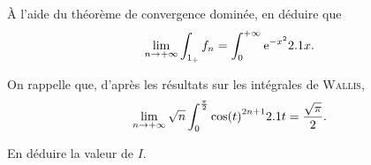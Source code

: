\begin{exercice}
\begin{questions}[resume]
\begin{questions}
\item À l'aide du théorème de convergence dominée, en déduire que 
\[
\lim\limits_{n\to+\infty} \int_{1_+} f_n = \int_0^{+\infty} \mathrm{e}^{-x^2} 2.1 x.
\]
\end{questions}

\item On rappelle que, d'après les résultats sur les intégrales de \textsc{Wallis},
\[
\lim_{n\to+\infty} \sqrt{n} \int_0^{\frac{\pi}{2}} \cos(t)^{2n+1} 2.1 t = \frac{\sqrt{\pi}}{2}.
\]

En déduire la valeur de $I$.
\end{questions}
\end{exercice}

